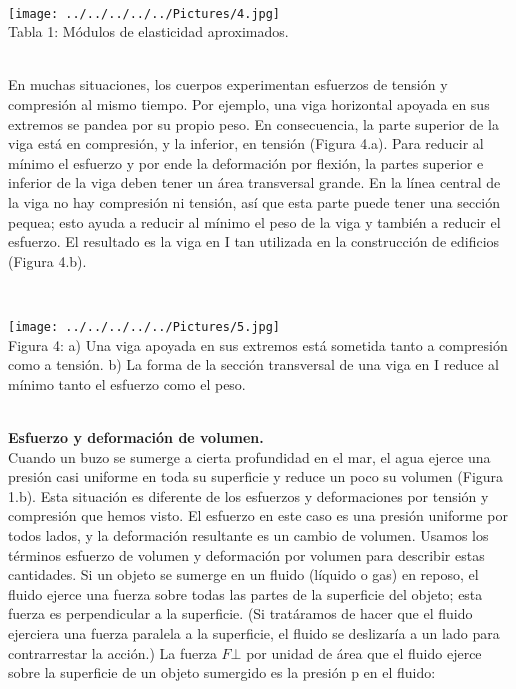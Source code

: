 \documentclass[10pt,a4paper]{article}
\begin{document}
\\
\begin{figure 4}
\centering
\texttt{[image: ../../../../../Pictures/4.jpg]}
\\
\caption{Tabla 1: M\'{o}dulos de elasticidad aproximados.}
\end{figure 4}
\\

En muchas situaciones, los cuerpos experimentan esfuerzos de tensi\'{o}n y compresi\'{o}n al mismo tiempo. Por ejemplo, una viga horizontal apoyada en sus extremos se pandea por su propio peso. En consecuencia, la parte superior de la viga est\'{a} en compresi\'{o}n, y la inferior, en tensi\'{o}n (Figura 4.a). Para reducir al m\'{i}nimo el esfuerzo y por ende la deformaci\'{o}n por flexi\'{o}n, la partes superior e inferior de la viga deben tener un \'{a}rea transversal grande. En la l\'{i}nea central de la viga no hay compresi\'{o}n ni tensi\'{o}n, as\'{i} que esta parte puede tener una secci\'{o}n pequea; esto ayuda a reducir al m\'{i}nimo el peso de la viga y tambi\'{e}n a reducir el esfuerzo. El resultado es la viga en I tan utilizada en la construcci\'{o}n de edificios (Figura 4.b).

\\
\begin{figure 5}
\centering
\texttt{[image: ../../../../../Pictures/5.jpg]}
\\
\caption{Figura 4: a) Una viga apoyada en sus extremos est\'{a} sometida tanto a compresi\'{o}n como a tensi\'{o}n. b) La forma de la secci\'{o}n transversal de una viga en I reduce al m\'{i}nimo tanto el esfuerzo como el peso.}
\end{figure 5}
\\

\textbf{Esfuerzo y deformaci\'{o}n de volumen.}\\ 

Cuando un buzo se sumerge a cierta profundidad en el mar, el agua ejerce una presi\'{o}n
casi uniforme en toda su superficie y reduce un poco su volumen (Figura 1.b). Esta situaci\'{o}n es diferente de los esfuerzos y deformaciones por tensi\'{o}n y compresi\'{o}n que hemos visto. El esfuerzo en este caso es una presi\'{o}n uniforme por todos lados, y la deformaci\'{o}n resultante es un cambio de volumen. Usamos los t\'{e}rminos esfuerzo de volumen y deformaci\'{o}n por volumen para describir estas cantidades.
Si un objeto se sumerge en un fluido (l\'{i}quido o gas) en reposo, el fluido ejerce una
fuerza sobre todas las partes de la superficie del objeto; esta fuerza es perpendicular a
la superficie. (Si trat\'{a}ramos de hacer que el fluido ejerciera una fuerza paralela a la
superficie, el fluido se deslizar\'{i}a a un lado para contrarrestar la acci\'{o}n.) La fuerza $F\bot$ por unidad de \'{a}rea que el fluido ejerce sobre la superficie de un objeto sumergido es la presi\'{o}n p en el fluido:\\
\end{document}
